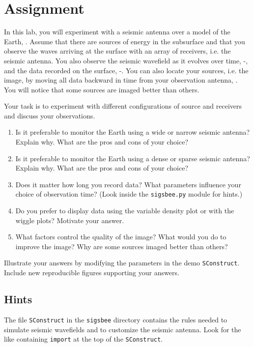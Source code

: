 \section{Assignment}

In this lab, you will experiment with a seismic antenna over a model
of the Earth, . Assume that there are sources of energy in
the subsurface and that you observe the waves arriving at the surface
with an array of receivers, i.e. the seismic antenna. You also observe
the seismic wavefield as it evolves over time,
-, and the data recorded on the surface,
-. You can also locate your sources, i.e. the
image, by moving all data backward in time from your observation
antenna, . You will notice that some sources are imaged
better than others.

Your task is to experiment with different configurations of source and
receivers and discuss your observations.

\begin{enumerate}
\item Is it preferable to monitor the Earth using a wide or narrow
  seismic antenna? Explain why. What are the pros and cons of your
  choice? 
\item Is it preferable to monitor the Earth using a dense or sparse
  seismic antenna? Explain why. What are the pros and cons of your
  choice? 
\item Does it matter how long you record data? What parameters
  influence your choice of observation time? 
  (Look inside the \texttt{sigsbee.py} module for hints.)
\item Do you prefer to display data using the variable density plot or
  with the wiggle plots? Motivate your answer.
\item What factors control the quality of the image? What would you do
  to improve the image? Why are some sources imaged better than
  others?
\end{enumerate}
Illustrate your answers by modifying the parameters in the demo
\texttt{SConstruct}. Include new reproducible figures supporting your
answers. 

\subsection{Hints}
The file \texttt{SConstruct} in the \texttt{sigsbee} directory
contains the rules needed to simulate seismic wavefields and to
customize the seismic antenna. Look for the like containing
\texttt{import} at the top of the \texttt{SConstruct}.

